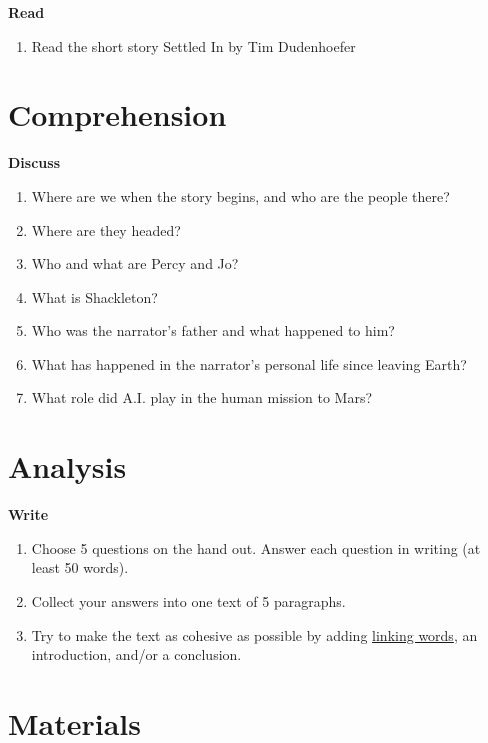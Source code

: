 \documentclass[11pt,a4paper,oneside]{book}
\newcommand{\tasktitle}[1]{{\color{blue}\bfseries #1}\par\smallskip}
\begin{document}
\begin{taskbox}
\tasktitle{Read}
\begin{enumerate}
\item Read the short story Settled In by Tim Dudenhoefer
\end{enumerate}
\end{taskbox}

\section*{Comprehension}
\begin{taskbox}
\tasktitle{Discuss}
\begin{enumerate}
\item Where are we when the story begins, and who are the people there?
\item Where are they headed?
\item Who and what are Percy and Jo?
\item What is Shackleton?
\item Who was the narrator’s father and what happened to him?
\item What has happened in the narrator’s personal life since leaving Earth?
\item What role did A.I. play in the human mission to Mars?
\end{enumerate}
\end{taskbox}

\section*{Analysis}
\begin{taskbox}
\tasktitle{Write}
\begin{enumerate}
\item Choose 5 questions on the hand out. Answer each question in writing (at least 50 words).
\item Collect your answers into one text of 5 paragraphs.
\item Try to make the text as cohesive as possible by adding \href{https://theenglishhandbook.systime.dk/?id=247\#c1764}{linking words}, an introduction, and/or a conclusion.
\end{enumerate}
\end{taskbox}

\section*{Materials}
\end{document}
